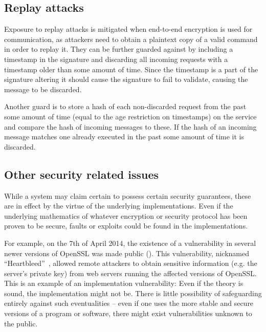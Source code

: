 \subsection{Replay attacks}
Exposure to replay attacks is mitigated when end-to-end encryption is used for communication, as attackers need to obtain a plaintext copy of a valid command in order to replay it.
They can be further guarded against by including a timestamp in the signature and discarding all incoming requests with a timestamp older than some amount of time.
Since the timestamp is a part of the signature altering it should cause the signature to fail to validate, causing the message to be discarded.

Another guard is to store a hash of each non-discarded request from the past some amount of time (equal to the age restriction on timestamps) on the service and compare the hash of incoming messages to these.
If the hash of an incoming message matches one already executed in the past some amount of time it is discarded.

\subsection{Other security related issues}
While a system may claim certain to possess certain security guarantees, these are in effect by the virtue of the underlying implementations.
Even if the underlying mathematics of whatever encryption or security protocol has been proven to be secure, faults or exploits could be found in the implementations.

For example, on the 7th of April 2014, the existence of a vulnerability in several newer versions of OpenSSL was made public ().
This vulnerability, nicknamed ``Heartbleed''~\citep{heartbleed}, allowed remote attackers to obtain sensitive information (e.g. the server's private key) from web servers running the affected versions of OpenSSL.
This is an example of an implementation vulnerability: Even if the theory is sound, the implementation might not be.
There is little possibility of safeguarding entirely against such eventualities -- even if one uses the more stable and secure versions of a program or software, there might exist vulnerabilities unknown to the public.

